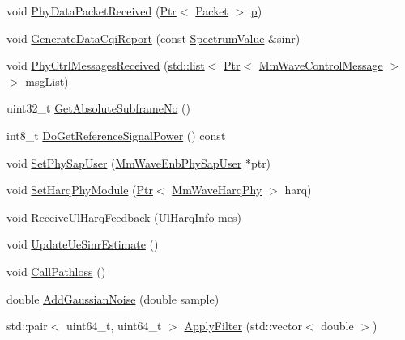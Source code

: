 \begin{DoxyCompactItemize}
\item 
void \hyperlink{classns3_1_1MmWaveEnbPhy_a4da2f965c88f46e2ff20d17992b001ce}{Phy\+Data\+Packet\+Received} (\hyperlink{classns3_1_1Ptr}{Ptr}$<$ \hyperlink{classns3_1_1Packet}{Packet} $>$ \hyperlink{lte__link__budget__x2__handover__measures_8m_ac9de518908a968428863f829398a4e62}{p})
\item 
void \hyperlink{classns3_1_1MmWaveEnbPhy_a016525ae90876006ff14b0a73c9a33a4}{Generate\+Data\+Cqi\+Report} (const \hyperlink{classns3_1_1SpectrumValue}{Spectrum\+Value} \&sinr)
\item 
void \hyperlink{classns3_1_1MmWaveEnbPhy_ab29ddb6f1128a28601a8cc9259fedf78}{Phy\+Ctrl\+Messages\+Received} (\hyperlink{openflow-interface_8h_afd9bcfa176617760671b67580f536fa7}{std\+::list}$<$ \hyperlink{classns3_1_1Ptr}{Ptr}$<$ \hyperlink{classns3_1_1MmWaveControlMessage}{Mm\+Wave\+Control\+Message} $>$ $>$ msg\+List)
\item 
uint32\+\_\+t \hyperlink{classns3_1_1MmWaveEnbPhy_a044232f4d85492eaa1f5938fb60a85ca}{Get\+Absolute\+Subframe\+No} ()
\item 
int8\+\_\+t \hyperlink{classns3_1_1MmWaveEnbPhy_a8786bf8abbd0520a028513d663ca56da}{Do\+Get\+Reference\+Signal\+Power} () const 
\item 
void \hyperlink{classns3_1_1MmWaveEnbPhy_aa8098860dd2b45d7ef023252c3969839}{Set\+Phy\+Sap\+User} (\hyperlink{classns3_1_1MmWaveEnbPhySapUser}{Mm\+Wave\+Enb\+Phy\+Sap\+User} $\ast$ptr)
\item 
void \hyperlink{classns3_1_1MmWaveEnbPhy_aed7f9e4b2a7a426dfab0a5c28aac7e3c}{Set\+Harq\+Phy\+Module} (\hyperlink{classns3_1_1Ptr}{Ptr}$<$ \hyperlink{classns3_1_1MmWaveHarqPhy}{Mm\+Wave\+Harq\+Phy} $>$ harq)
\item 
void \hyperlink{classns3_1_1MmWaveEnbPhy_af4e7efb885e564c6a2f2b82303ef098a}{Receive\+Ul\+Harq\+Feedback} (\hyperlink{structns3_1_1UlHarqInfo}{Ul\+Harq\+Info} mes)
\item 
void \hyperlink{classns3_1_1MmWaveEnbPhy_a09aa03118ceed8c46f87dc0f6b6c71a2}{Update\+Ue\+Sinr\+Estimate} ()
\item 
void \hyperlink{classns3_1_1MmWaveEnbPhy_a5ebec66c2776262f3d54c43ee1cc34db}{Call\+Pathloss} ()
\item 
double \hyperlink{classns3_1_1MmWaveEnbPhy_a5c2d760ae23133aae1b22b513a864192}{Add\+Gaussian\+Noise} (double sample)
\item 
std\+::pair$<$ uint64\+\_\+t, uint64\+\_\+t $>$ \hyperlink{classns3_1_1MmWaveEnbPhy_a0e187efd67bd94a6ace7856777aafe8d}{Apply\+Filter} (std\+::vector$<$ double $>$)

\end{DoxyCompactItemize}
